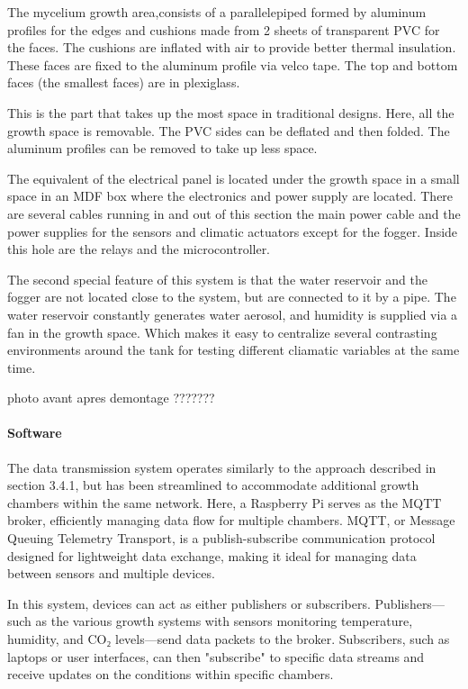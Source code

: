 The mycelium growth area,consists of a parallelepiped formed by aluminum profiles for the edges and cushions made from 2 sheets of transparent PVC for the faces. The cushions are inflated with air to provide better thermal insulation. These faces are fixed to the aluminum profile via velco tape. The top and bottom faces (the smallest faces) are in plexiglass. 

This is the part that takes up the most space in traditional designs. Here, all the growth  space is removable. The PVC sides can be deflated and then folded. The aluminum profiles can be removed to take up less space.

The equivalent of the electrical panel is located under the growth space in a small space in an MDF box where the electronics and power supply are located. There are several cables running in and out of this section the main power cable and the power supplies for the sensors and climatic actuators except for the fogger. Inside this hole are the relays and the microcontroller. 

The second special feature of this system is that the water reservoir and the fogger are not located close to the system, but are connected to it by a pipe. The water reservoir constantly generates water aerosol, and humidity is supplied via a fan in the growth space. 
Which makes it easy to centralize several contrasting environments around the tank for testing different cliamatic variables at the same time. 



photo avant apres demontage ???????

\paragraph{Software}

The data transmission system operates similarly to the approach described in section 3.4.1, but has been streamlined to accommodate additional growth chambers within the same network. Here, a Raspberry Pi serves as the MQTT broker, efficiently managing data flow for multiple chambers. MQTT, or Message Queuing Telemetry Transport, is a publish-subscribe communication protocol designed for lightweight data exchange, making it ideal for managing data between sensors and multiple devices.

In this system, devices can act as either publishers or subscribers. Publishers—such as the various growth systems with sensors monitoring temperature, humidity, and CO₂ levels—send data packets to the broker. Subscribers, such as laptops or user interfaces, can then "subscribe" to specific data streams and receive updates on the conditions within specific chambers.

